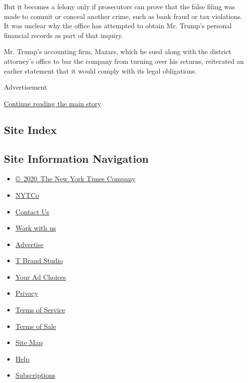 But it becomes a felony only if prosecutors can prove that the false
filing was made to commit or conceal another crime, such as bank fraud
or tax violations. It was unclear why the office has attempted to obtain
Mr. Trump's personal financial records as part of that inquiry.

Mr. Trump's accounting firm, Mazars, which he sued along with the
district attorney's office to bar the company from turning over his
returns, reiterated an earlier statement that it would comply with its
legal obligations.

Advertisement

\protect\hyperlink{after-bottom}{Continue reading the main story}

\hypertarget{site-index}{%
\subsection{Site Index}\label{site-index}}

\hypertarget{site-information-navigation}{%
\subsection{Site Information
Navigation}\label{site-information-navigation}}

\begin{itemize}
\tightlist
\item
  \href{https://help.nytimes3xbfgragh.onion/hc/en-us/articles/115014792127-Copyright-notice}{©~2020~The
  New York Times Company}
\end{itemize}

\begin{itemize}
\tightlist
\item
  \href{https://www.nytco.com/}{NYTCo}
\item
  \href{https://help.nytimes3xbfgragh.onion/hc/en-us/articles/115015385887-Contact-Us}{Contact
  Us}
\item
  \href{https://www.nytco.com/careers/}{Work with us}
\item
  \href{https://nytmediakit.com/}{Advertise}
\item
  \href{http://www.tbrandstudio.com/}{T Brand Studio}
\item
  \href{https://www.nytimes3xbfgragh.onion/privacy/cookie-policy\#how-do-i-manage-trackers}{Your
  Ad Choices}
\item
  \href{https://www.nytimes3xbfgragh.onion/privacy}{Privacy}
\item
  \href{https://help.nytimes3xbfgragh.onion/hc/en-us/articles/115014893428-Terms-of-service}{Terms
  of Service}
\item
  \href{https://help.nytimes3xbfgragh.onion/hc/en-us/articles/115014893968-Terms-of-sale}{Terms
  of Sale}
\item
  \href{https://spiderbites.nytimes3xbfgragh.onion}{Site Map}
\item
  \href{https://help.nytimes3xbfgragh.onion/hc/en-us}{Help}
\item
  \href{https://www.nytimes3xbfgragh.onion/subscription?campaignId=37WXW}{Subscriptions}
\end{itemize}
